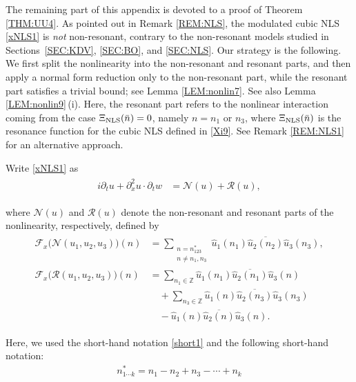 \documentclass[letterpaper, 11pt,  reqno]{amsart}
\newcommand{\1}{\hspace{0.5mm}\text{I}\hspace{0.5mm}}
\newcommand{\noi}{\noindent}
\newcommand{\Z}{\mathbb{Z}}
\newcommand{\RR}{\mathcal{R}}
\newcommand{\F}{\mathcal{F}}
\newcommand{\ft}{\widehat}
\newcommand{\cj}{\overline}
\newcommand{\dx}{\partial_x}
\newcommand{\dt}{\partial_t}
\newcommand{\NN}{\mathcal{N}}
\newcommand{\NLS}{\text{\rm NLS} }
\numberwithin{equation}{section}
\numberwithin{theorem}{section}
\begin{document}
\medskip

The remaining part of this appendix is devoted to a proof of Theorem \ref{THM:UU4}.
As pointed out in Remark \ref{REM:NLS}, 
the  modulated cubic NLS \eqref{xNLS1} 
is {\it not} non-resonant, 
contrary to 
 the non-resonant models studied in 
Sections~\ref{SEC:KDV}, 
\ref{SEC:BO}, and \ref{SEC:NLS}.
Our strategy is the following.
We first split the nonlinearity into 
the non-resonant and resonant parts, 
and then apply a normal form reduction
only to the non-resonant part, 
while the  resonant part satisfies a trivial bound;
see Lemma \ref{LEM:nonlin7}.
See also Lemma \ref{LEM:nonlin9}\,(i).
Here, the resonant
part
refers to the nonlinear interaction coming
from the case 
$\Xi_\NLS (\bar n) =0$, namely $n = n_1$ or $n_3$,  
where 
$\Xi_\NLS (\bar n)$ is the resonance function
for the cubic NLS defined in 
\eqref{Xi9}.
See Remark \ref{REM:NLS1} for an alternative approach.






Write \eqref{xNLS1} as 
\begin{align}
\begin{split}
i \dt u + \dx^2 u \cdot \dt w
& = \NN(u) + \RR(u), 
\end{split}
\label{xNLS2}
\end{align}


\noi
where $\NN(u)$ and $\RR(u)$ denote the non-resonant 
 and    resonant parts of the nonlinearity,
respectively, 
defined by 
\begin{align}
\begin{split}
\F_x\big(\NN(u_1,u_2,u_3)\big)(n) 
& = \sum_{\substack{n = n_{123}^*\\ n\neq n_{1},n_{3}}}
\ft u_1 (n_1) \cj{\ft u_2 (n_2)} \ft u_3 (n_3), \\
\F_x\big(\RR(u_1,u_2,u_3)\big) (n) 
& = 
 \sum_{n_1 \in \Z}
\ft u_1 (n_1) \cj{\ft u_2 (n_1)} \ft u_3 (n)\\
& \quad + 
 \sum_{n_3 \in \Z}
\ft u_1 (n) \cj{\ft u_2 (n_3)} \ft u_3 (n_3)\\
& \quad 
- 
\ft u_1 (n) \cj{\ft u_2 (n)} \ft u_3 (n).
\end{split}
\label{non1}
\end{align}

\noi
Here,    we used 
 the short-hand notation \eqref{short1}
and 
the following short-hand notation:
\begin{align}
n_{1\cdots k}^* = n_1 - n_2 + n_3 -  \cdots + n_k
\label{no2}
\end{align}
\end{document}
